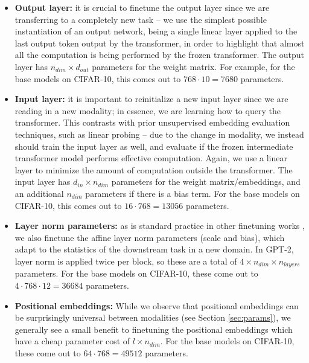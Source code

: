 \begin{itemize}[leftmargin=*]
    \item \textbf{Output layer:} it is crucial to finetune the output layer since we are transferring to a completely new task -- we use the simplest possible instantiation of an output network, being a single linear layer applied to the last output token output by the transformer, in order to highlight that almost all the computation is being performed by the frozen transformer.
    The output layer has $n_{dim} \times d_{out}$ parameters for the weight matrix.
    For example, for the base models on CIFAR-10, this comes out to $768 \cdot 10 = 7680$ parameters.

    \item \textbf{Input layer:} it is important to reinitialize a new input layer since we are reading in a new modality; in essence, we are learning how to query the transformer.
    This contrasts with prior unsupervised embedding evaluation techniques, such as linear probing -- due to the change in modality, we instead should train the input layer as well, and evaluate if the frozen intermediate transformer model performs effective computation.
    Again, we use a linear layer to minimize the amount of computation outside the transformer.
    The input layer has $d_{in} \times n_{dim}$ parameters for the weight matrix/embeddings, and an additional $n_{dim}$ parameters if there is a bias term.
    For the base models on CIFAR-10, this comes out to $16 \cdot 768 = 13056$ parameters.
    
    \item \textbf{Layer norm parameters:} as is standard practice in other finetuning works \citep{rebuffi2017adapter, houlsby2019adapter}, we also finetune the affine layer norm parameters (scale and bias), which adapt to the statistics of the downstream task in a new domain.
    In GPT-2, layer norm is applied twice per block, so these are a total of $4 \times n_{dim} \times n_{layers}$ parameters.
    For the base models on CIFAR-10, these come out to $4 \cdot 768 \cdot 12 = 36684$ parameters.
    
    \item \textbf{Positional embeddings:} While we observe that positional embeddings can be surprisingly universal between modalities (see Section \ref{sec:params}), we generally see a small benefit to finetuning the positional embeddings which have a cheap parameter cost of $l \times n_{dim}$.
    For the base models on CIFAR-10, these come out to $64 \cdot 768 = 49512$ parameters.
\end{itemize}
\vspace{2em}

